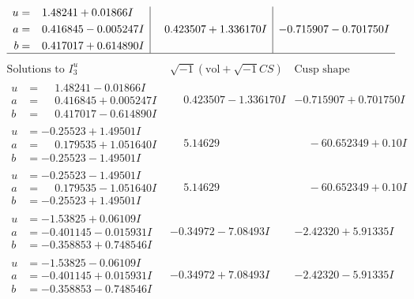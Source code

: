 \documentclass[1p]{elsarticle_modified}
\theoremstyle{definition}
\newcommand{\I}{\sqrt{-1}}
\begin{document}
$$\begin{array}{c|c|c}
\begin{aligned}
u &= \phantom{-}1.48241 + 0.01866 I \\
a &= \phantom{-}0.416845 - 0.005247 I \\
b &= \phantom{-}0.417017 + 0.614890 I\end{aligned}
 & \phantom{-}0.423507 + 1.336170 I & -0.715907 - 0.701750 I\\
 \hline 
 \end{array}$$\newpage$$\begin{array}{c|c|c}  
\text{Solutions to }I^u_{3}& \I (\text{vol} + \sqrt{-1}CS) & \text{Cusp shape}\\
 \hline 
\begin{aligned}
u &= \phantom{-}1.48241 - 0.01866 I \\
a &= \phantom{-}0.416845 + 0.005247 I \\
b &= \phantom{-}0.417017 - 0.614890 I\end{aligned}
 & \phantom{-}0.423507 - 1.336170 I & -0.715907 + 0.701750 I \\ \hline\begin{aligned}
u &= -0.25523 + 1.49501 I \\
a &= \phantom{-}0.179535 + 1.051640 I \\
b &= -0.25523 - 1.49501 I\end{aligned}
 & \phantom{-}5.14629\phantom{ +0.000000I} & \phantom{-}                -6
0.652349 + 0. 10   I\phantom{ +0.000000I} \\ \hline\begin{aligned}
u &= -0.25523 - 1.49501 I \\
a &= \phantom{-}0.179535 - 1.051640 I \\
b &= -0.25523 + 1.49501 I\end{aligned}
 & \phantom{-}5.14629\phantom{ +0.000000I} & \phantom{-}                -6
0.652349 + 0. 10   I\phantom{ +0.000000I} \\ \hline\begin{aligned}
u &= -1.53825 + 0.06109 I \\
a &= -0.401145 - 0.015931 I \\
b &= -0.358853 + 0.748546 I\end{aligned}
 & -0.34972 - 7.08493 I & -2.42320 + 5.91335 I \\ \hline\begin{aligned}
u &= -1.53825 - 0.06109 I \\
a &= -0.401145 + 0.015931 I \\
b &= -0.358853 - 0.748546 I\end{aligned}
 & -0.34972 + 7.08493 I & -2.42320 - 5.91335 I \\ \hline\begin{aligned}

\end{aligned}
\end{array}$$
\end{document}
